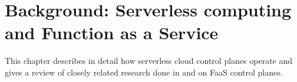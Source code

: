\chapter{Background: Serverless computing and Function as a Service}
\label{chap:serverless}

This chapter describes in detail how serverless cloud control planes operate and gives a review of closely related research done in and on FaaS control planes.




